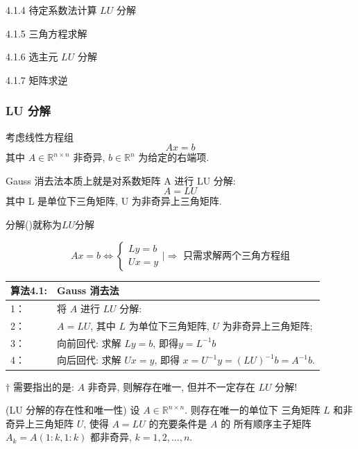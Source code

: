 \documentclass[12pt,a4paper]{article}
\begin{document}
4.1.4 待定系数法计算 $LU$ 分解

4.1.5 三角方程求解

4.1.6 选主元 $LU$ 分解

4.1.7 矩阵求逆

\subsubsection{LU 分解}
考虑线性方程组
\begin{equation}
A x=b
\end{equation}
其中 $A ∈ \mathbb{R}^{n×n}$ 非奇异, $b ∈ \mathbb{R}^n$ 为给定的右端项.

Gauss 消去法本质上就是对系数矩阵 A 进行 LU 分解:
\begin{equation}
A=L U
\end{equation}
其中 L 是单位下三角矩阵, U 为非奇异上三角矩阵.


分解()就称为$LU$分解

\begin{equation}
A x=b \Longleftrightarrow\left\{\begin{array}{l}{L y=b} \\ {U x=y}\end{array} | \Longrightarrow \text{ 只需求解两个三角方程组} \right.
\end{equation}

\begin{table}  
	\begin{tabular*}{16cm}{ll}  
		\hline  
		算法4.1: & Gauss 消去法 \\  
		\hline  
		1：   &将 $A$ 进行 $LU$ 分解:\\  
		2：   &$A = LU$, 其中 $L$ 为单位下三角矩阵, $U$ 为非奇异上三角矩阵;\\
		3：   &向前回代: 求解 $Ly = b$, 即得$ y = L^{-1}b$\\
		4：   &向后回代: 求解 $Ux = y$, 即得 $x = U^{-1}y = (LU)^{-1}b = A^{-1}b$.\\  
		\hline  
	\end{tabular*}  
\end{table} 


$†$ 需要指出的是: $A$ 非奇异, 则解存在唯一, 但并不一定存在 $LU$ 分解!



\begin{theorem}(LU 分解的存在性和唯一性)
	设 $A ∈ \mathbb{R}^{n×n}$. 则存在唯一的单位下
	三角矩阵 $L$ 和非奇异上三角矩阵 $U$, 使得 $A = LU$ 的充要条件是 $A$ 的
	所有顺序主子矩阵 $A_k = A(1:k, 1:k)$ 都非奇异, $k = 1, 2, . . . , n.$	
\end{theorem}
\end{document}
